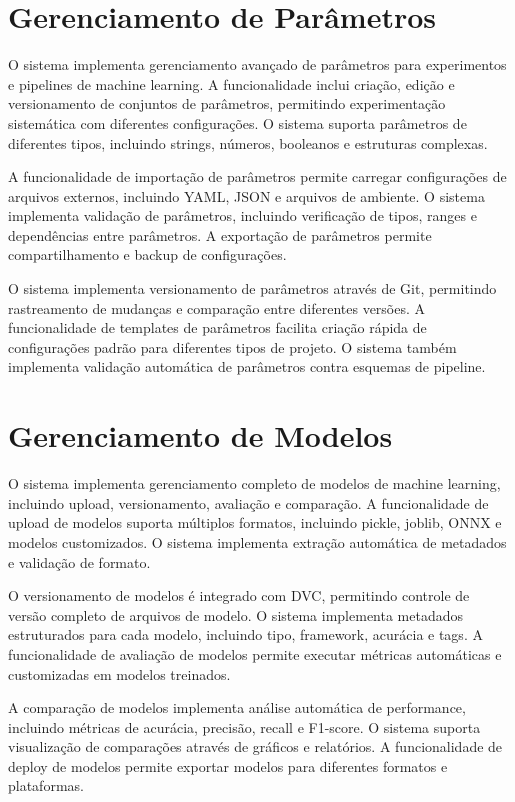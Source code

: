 \documentclass[12pt,a4paper]{article}
\begin{document}
\section{Gerenciamento de Parâmetros}

O sistema implementa gerenciamento avançado de parâmetros para experimentos e pipelines de machine learning. A funcionalidade inclui criação, edição e versionamento de conjuntos de parâmetros, permitindo experimentação sistemática com diferentes configurações. O sistema suporta parâmetros de diferentes tipos, incluindo strings, números, booleanos e estruturas complexas.

A funcionalidade de importação de parâmetros permite carregar configurações de arquivos externos, incluindo YAML, JSON e arquivos de ambiente. O sistema implementa validação de parâmetros, incluindo verificação de tipos, ranges e dependências entre parâmetros. A exportação de parâmetros permite compartilhamento e backup de configurações.

O sistema implementa versionamento de parâmetros através de Git, permitindo rastreamento de mudanças e comparação entre diferentes versões. A funcionalidade de templates de parâmetros facilita criação rápida de configurações padrão para diferentes tipos de projeto. O sistema também implementa validação automática de parâmetros contra esquemas de pipeline.

\section{Gerenciamento de Modelos}

O sistema implementa gerenciamento completo de modelos de machine learning, incluindo upload, versionamento, avaliação e comparação. A funcionalidade de upload de modelos suporta múltiplos formatos, incluindo pickle, joblib, ONNX e modelos customizados. O sistema implementa extração automática de metadados e validação de formato.

O versionamento de modelos é integrado com DVC, permitindo controle de versão completo de arquivos de modelo. O sistema implementa metadados estruturados para cada modelo, incluindo tipo, framework, acurácia e tags. A funcionalidade de avaliação de modelos permite executar métricas automáticas e customizadas em modelos treinados.

A comparação de modelos implementa análise automática de performance, incluindo métricas de acurácia, precisão, recall e F1-score. O sistema suporta visualização de comparações através de gráficos e relatórios. A funcionalidade de deploy de modelos permite exportar modelos para diferentes formatos e plataformas.
\end{document}
